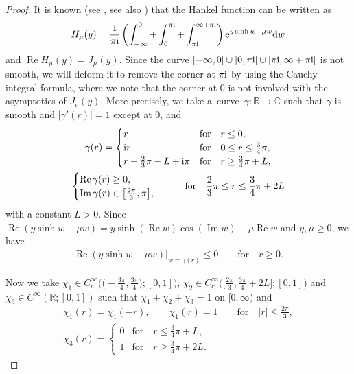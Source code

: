 \documentclass[pdftex]{sigma}
\numberwithin{equation}{section}
\def\R{\mathbb{R}}%
\DeclareMathOperator{\re}{Re}%
\DeclareMathOperator{\im}{Im}%
\def\c{\gamma}
\def\m{\mu}
\def\n{\nu}
\begin{document}
\begin{proof}
It is known (see \cite[Section~6.21\,(3)]{W}, see also \cite[equation~(9.7)]{IJ}) that the Hankel function can be written as
\begin{align}\label{Hankelint}
H_{\m}(y)=\frac{1}{\pi {\rm i}}\left(\int_{-\infty}^0+\int_0^{\pi {\rm i}}+\int_{\pi {\rm i}}^{\infty+\pi {\rm i}}\right){\rm e}^{y\sinh w-\m w}{\rm d}w
\end{align}
and $\re H_{\m}(y)=J_{\m}(y)$. Since the curve $[-\infty,0]\cup [0,\pi {\rm i}]\cup [\pi {\rm i},\infty+\pi {\rm i}]$ is not smooth, we will deform it to remove the corner at $\pi {\rm i}$ by using the Cauchy integral formula, where we note that the corner at $0$ is not involved with the asymptotics of $J_{\n}(y)$.
More precisely, we take a~curve~${\c\colon\R\to \mathbb{C}}$ such that $\c$ is smooth and $|\c'(r)|=1$ except at $0$, and
\begin{gather*}
\c(r)=\begin{cases}
r& \text{for}\quad r\leq 0,\\
 {\rm i}r& \text{for}\quad 0\leq r\leq \frac{3}{4}\pi,\\
r-\frac{2}{3}\pi-L+ {\rm i}\pi& \text{for}\quad r\geq \frac{3}{4}\pi+L,
\end{cases} \\
\begin{cases}\re \c(r)\geq 0,\\ \im \c(r)\in \bigl[\frac{2\pi}{3},\pi\bigr], \end{cases}\qquad \text{for}\quad \frac{2}{3}\pi\leq r\leq \frac{3}{4}\pi+2L
\end{gather*}
with a constant $L>0$. Since $\re (y\sinh w-\m w)=y\sinh(\re w)\cos(\im w)-\m \re w$ and $y,\m\geq 0$, we have
\begin{align}\label{Besphaseleq0}
\re (y\sinh w-\m w)|_{w=\c(r)}\leq 0\qquad \text{for}\quad r\geq 0.
\end{align}

Now we take $\chi_1\in C_c^{\infty}\bigl(\bigl(-\frac{3\pi}{4},\frac{3\pi}{4}\bigr);[0,1]\bigr)$, $\chi_2\in C_c^{\infty}\bigl(\bigl[\frac{2\pi}{3},\frac{3\pi}{4}+2L\bigr];[0,1]\bigr)$ and $\chi_3\in C^{\infty}(\R;[0,1])$ such that $\chi_1+\chi_2+\chi_3=1$ on $[0,\infty)$ and
\begin{gather*}
\chi_1(r)=\chi_1(-r),\qquad \chi_1(r)=1\qquad \text{for}\quad |r|\leq \frac{2\pi}{3},\\
 \chi_3(r)=\begin{cases}0& \text{for}\quad r\leq \frac{3}{4}\pi+L,\\ 1& \text{for}\quad r\geq \frac{3}{4}\pi+2L. \end{cases}
\end{gather*}


\end{proof}
\end{document}
